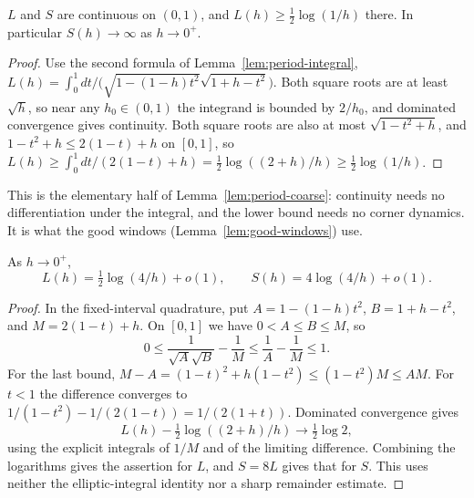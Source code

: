 \begin{lemma}
\label{lem:period-basic}
\leanok
$L$ and $S$ are continuous on $(0,1)$, and $L(h)\ge\tfrac12\log(1/h)$ there. In particular
$S(h)\to\infty$ as $h\to0^+$.
\end{lemma}

\begin{proof}
\leanok
Use the second formula of Lemma~\ref{lem:period-integral},
$L(h)=\int_0^1dt/\bigl(\sqrt{1-(1-h)t^2}\sqrt{1+h-t^2}\bigr)$. Both square roots are at least
$\sqrt h$, so near any $h_0\in(0,1)$ the integrand is bounded by $2/h_0$, and dominated
convergence gives continuity. Both square roots are also at most $\sqrt{1-t^2+h}$, and
$1-t^2+h\le2(1-t)+h$ on $[0,1]$, so
$L(h)\ge\int_0^1dt/(2(1-t)+h)=\tfrac12\log((2+h)/h)\ge\tfrac12\log(1/h)$.
\end{proof}

\begin{remark}
This is the elementary half of Lemma~\ref{lem:period-coarse}: continuity needs no
differentiation under the integral, and the lower bound needs no corner dynamics. It is
what the good windows (Lemma~\ref{lem:good-windows}) use.
\end{remark}

\begin{lemma}
\label{lem:period-leading-asymptotic}
\leanok
As $h\to0^+$,
\[
 L(h)=\tfrac12\log(4/h)+o(1),\qquad S(h)=4\log(4/h)+o(1).
\]
\end{lemma}

\begin{proof}
\leanok
In the fixed-interval quadrature, put $A=1-(1-h)t^2$, $B=1+h-t^2$,
and $M=2(1-t)+h$. On $[0,1]$ we have $0<A\le B\le M$, so
\[
  0\le \frac1{\sqrt A\sqrt B}-\frac1M
  \le \frac1A-\frac1M\le 1.
\]
For the last bound, $M-A=(1-t)^2+h(1-t^2)\le (1-t^2)M\le AM$.
For $t<1$ the difference converges to $1/(1-t^2)-1/(2(1-t))=1/(2(1+t))$.
Dominated convergence gives
\[
  L(h)-\tfrac12\log((2+h)/h)\longrightarrow \tfrac12\log 2,
\]
using the explicit integrals of $1/M$ and of the limiting difference.
Combining the logarithms gives the assertion for $L$, and $S=8L$ gives
that for $S$. This uses neither the elliptic-integral identity nor a
sharp remainder estimate.
\end{proof}

